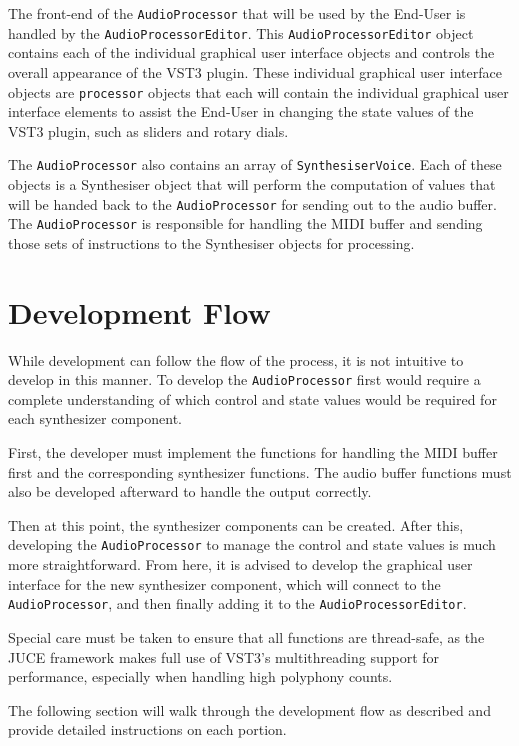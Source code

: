 \documentclass[a4paper,12pt]{report}
\begin{document}
The front-end of the \texttt{AudioProcessor} that will be used by the End-User is handled by the \texttt{AudioProcessorEditor}. This \texttt{AudioProcessorEditor} object contains each of the individual graphical user interface objects and controls the overall appearance of the VST3 plugin. These individual graphical user interface objects are \texttt{processor} objects that each will contain the individual graphical user interface elements to assist the End-User in changing the state values of the VST3 plugin, such as sliders and rotary dials.

The \texttt{AudioProcessor} also contains an array of \texttt{SynthesiserVoice}. Each of these objects is a Synthesiser object that will perform the computation of values that will be handed back to the \texttt{AudioProcessor}  for sending out to the audio buffer. The \texttt{AudioProcessor} is responsible for handling the MIDI buffer and sending those sets of instructions to the Synthesiser objects for processing.

\section{Development Flow}
\label{sec:devflow}
While development can follow the flow of the process, it is not intuitive to develop in this manner. To develop the \texttt{AudioProcessor} first would require a complete understanding of which control and state values would be required for each synthesizer component.

First, the developer must implement the functions for handling the MIDI buffer first and the corresponding synthesizer functions. The audio buffer functions must also be developed afterward to handle the output correctly.

Then at this point, the synthesizer components can be created. After this, developing the \texttt{AudioProcessor} to manage the control and state values is much more straightforward. From here, it is advised to develop the graphical user interface for the new synthesizer component, which will connect to the \texttt{AudioProcessor}, and then finally adding it to the \texttt{AudioProcessorEditor}.

Special care must be taken to ensure that all functions are thread-safe, as the JUCE framework makes full use of VST3's multithreading support for performance, especially when handling high polyphony counts.

The following section will walk through the development flow as described and provide detailed instructions on each portion.
\end{document}
